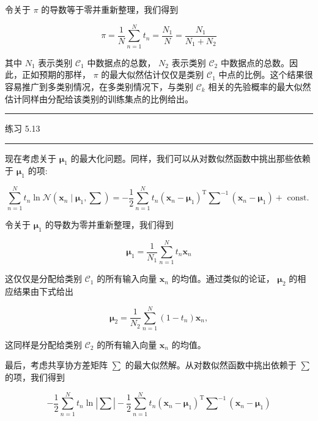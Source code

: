 \documentclass[10pt]{article}
\newcommand{\HRule}{\begin{center}\rule{0.9\linewidth}{0.2mm}\end{center}}
\begin{document}
令关于 \(\pi\) 的导数等于零并重新整理，我们得到

\[
\pi  = \frac{1}{N}\mathop{\sum }\limits_{{n = 1}}^{N}{t}_{n} = \frac{{N}_{1}}{N} = \frac{{N}_{1}}{{N}_{1} + {N}_{2}} \tag{5.56}
\]

其中 \({N}_{1}\) 表示类别 \({\mathcal{C}}_{1}\) 中数据点的总数， \({N}_{2}\) 表示类别 \({\mathcal{C}}_{2}\) 中数据点的总数。因此，正如预期的那样， \(\pi\) 的最大似然估计仅仅是类别 \({\mathcal{C}}_{1}\) 中点的比例。这个结果很容易推广到多类别情况，在多类别情况下，与类别 \({\mathcal{C}}_{k}\) 相关的先验概率的最大似然估计同样由分配给该类别的训练集点的比例给出。

\HRule

练习 5.13

\HRule

现在考虑关于 \({\mathbf{\mu }}_{1}\) 的最大化问题。同样，我们可以从对数似然函数中挑出那些依赖于 \({\mathbf{\mu }}_{1}\) 的项:

\[
\mathop{\sum }\limits_{{n = 1}}^{N}{t}_{n}\ln \mathcal{N}\left( {{\mathbf{x}}_{n} \mid  {\mathbf{\mu }}_{1},\mathbf{\sum }}\right)  =  - \frac{1}{2}\mathop{\sum }\limits_{{n = 1}}^{N}{t}_{n}{\left( {\mathbf{x}}_{n} - {\mathbf{\mu }}_{1}\right) }^{\mathrm{T}}{\mathbf{\sum }}^{-1}\left( {{\mathbf{x}}_{n} - {\mathbf{\mu }}_{1}}\right)  + \text{ const. } \tag{5.57}
\]

令关于 \({\mathbf{\mu }}_{1}\) 的导数为零并重新整理，我们得到

\[
{\mathbf{\mu }}_{1} = \frac{1}{{N}_{1}}\mathop{\sum }\limits_{{n = 1}}^{N}{t}_{n}{\mathbf{x}}_{n} \tag{5.58}
\]

这仅仅是分配给类别 \({\mathcal{C}}_{1}\) 的所有输入向量 \({\mathbf{x}}_{n}\) 的均值。通过类似的论证， \({\mathbf{\mu }}_{2}\) 的相应结果由下式给出

\[
{\mathbf{\mu }}_{2} = \frac{1}{{N}_{2}}\mathop{\sum }\limits_{{n = 1}}^{N}\left( {1 - {t}_{n}}\right) {\mathbf{x}}_{n}, \tag{5.59}
\]

这同样是分配给类别 \({\mathcal{C}}_{2}\) 的所有输入向量 \({\mathbf{x}}_{n}\) 的均值。

最后，考虑共享协方差矩阵 \(\sum\) 的最大似然解。从对数似然函数中挑出依赖于 \(\sum\) 的项，我们得到

\[
- \frac{1}{2}\mathop{\sum }\limits_{{n = 1}}^{N}{t}_{n}\ln \left| \mathbf{\sum }\right|  - \frac{1}{2}\mathop{\sum }\limits_{{n = 1}}^{N}{t}_{n}{\left( {\mathbf{x}}_{n} - {\mathbf{\mu }}_{1}\right) }^{\mathrm{T}}{\mathbf{\sum }}^{-1}\left( {{\mathbf{x}}_{n} - {\mathbf{\mu }}_{1}}\right)
\]
\end{document}
